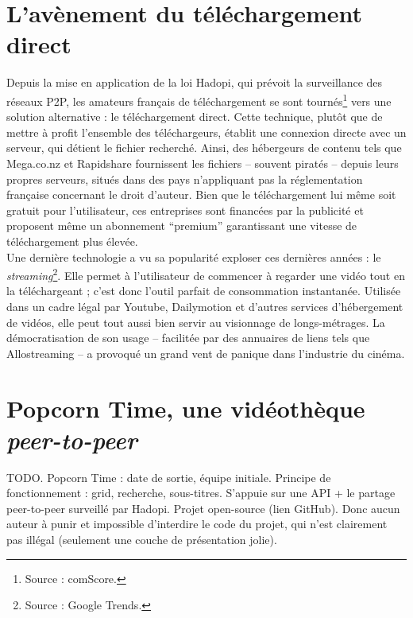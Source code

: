 \documentclass[a4paper]{report}
\begin{document}
	\section{L'avènement du téléchargement direct}
	Depuis la mise en application de la loi Hadopi, qui prévoit la surveillance des réseaux P2P, les amateurs français de téléchargement se sont tournés\footnote{Source : comScore.} vers une solution alternative : le téléchargement direct. Cette technique, plutôt que de mettre à profit l'ensemble des téléchargeurs, établit une connexion directe avec un serveur, qui détient le fichier recherché. Ainsi, des hébergeurs de contenu tels que Mega.co.nz et Rapidshare fournissent les fichiers – souvent piratés – depuis leurs propres serveurs, situés dans des pays n'appliquant pas la réglementation française concernant le droit d'auteur. Bien que le téléchargement lui même soit gratuit pour l'utilisateur, ces entreprises sont financées par la publicité et proposent même un abonnement ``premium'' garantissant une vitesse de téléchargement plus élevée.\\

	Une dernière technologie a vu sa popularité exploser ces dernières années : le \emph{streaming}\footnote{Source : Google Trends.}. Elle permet à l'utilisateur de commencer à regarder une vidéo tout en la téléchargeant ; c'est donc l'outil parfait de consommation instantanée. Utilisée dans un cadre légal par Youtube, Dailymotion et d'autres services d'hébergement de vidéos, elle peut tout aussi bien servir au visionnage de longs-métrages. La démocratisation de son usage – facilitée par des annuaires de liens tels que Allostreaming – a provoqué un grand vent de panique dans l'industrie du cinéma.

	\section{Popcorn Time, une vidéothèque \emph{peer-to-peer}}
	TODO. Popcorn Time : date de sortie, équipe initiale. Principe de fonctionnement : grid, recherche, sous-titres. S'appuie sur une API + le partage peer-to-peer surveillé par Hadopi. Projet open-source (lien GitHub). Donc aucun auteur à punir et impossible d'interdire le code du projet, qui n'est clairement pas illégal (seulement une couche de présentation jolie).
\end{document}
